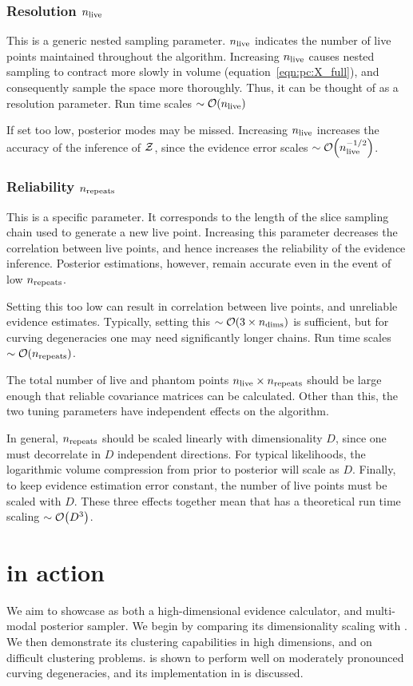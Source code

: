 \subsubsection*{Resolution $n_{\mathrm{live}}$ }
This is a generic nested sampling parameter. $n_{\mathrm{live}}$ indicates the number of live points maintained throughout the algorithm. Increasing $n_{\mathrm{live}}$ causes nested sampling to contract more slowly in volume (equation~\ref{eqn:pc:X_full}), and consequently sample the space more thoroughly. Thus, it can be thought of as a resolution parameter. Run time scales ${\sim\mathcal{O}{\left(n_{\mathrm{live}}\right)}}$

If set too low, posterior modes may be missed. Increasing $n_{\mathrm{live}}$ increases the accuracy of the inference of $\mathcal{Z}$, since the evidence error scales ${\sim\mathcal{O}{\left(n_{\mathrm{live}}^{-1/2}\right)}}$. 

\subsubsection*{Reliability $n_{\mathrm{repeats}}$}
This is a \PolyChord{} specific parameter. It corresponds to the length of the slice sampling chain used to generate a new live point. Increasing this parameter decreases the correlation between live points, and hence increases the reliability of the evidence inference. Posterior estimations, however, remain accurate even in the event of low $n_{\mathrm{repeats}}$.

Setting this too low can result in correlation between live points, and unreliable evidence estimates. Typically, setting this ${\sim\mathcal{O}{\left(3\times n_{\mathrm{dims}}\right)}}$ is sufficient, but for curving degeneracies one may need significantly longer chains. Run time scales ${\sim\mathcal{O}{\left(n_{\mathrm{repeats}}\right)}}$. 

The total number of live and phantom points ${n_{\mathrm{live}}\times n_{\mathrm{repeats}}}$ should be large enough that reliable covariance matrices can be calculated. Other than this, the two tuning parameters have independent effects on the algorithm. 

In general, $n_{\mathrm{repeats}}$ should be scaled linearly with dimensionality $D$, since one must decorrelate in $D$ independent directions. For typical likelihoods, the logarithmic volume compression from prior to posterior will scale as $D$. Finally, to keep evidence estimation error constant, the number of live points must be scaled with $D$. These three effects together mean that \PolyChord{} has a theoretical run time scaling ${\sim\mathcal{O}{\left(D^3\right)}}$.

\section{\PolyChord{} in action}
\label{sec:pc:polychord_in_action}
We aim to showcase \PolyChord{} as both a high-dimensional evidence calculator, and multi-modal posterior sampler. We begin by comparing its dimensionality scaling with \MultiNest{}. We then demonstrate its clustering capabilities in high dimensions, and on difficult clustering problems. \PolyChord{} is shown to perform well on moderately pronounced curving degeneracies, and its implementation in \CosmoMC{} is discussed.

